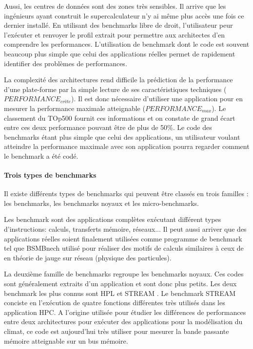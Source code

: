     
    Aussi, les centres de données sont des zones très sensibles. Il arrive que les ingénieurs ayant construit le supercalculateur n'y ai même plus accès une fois ce dernier installé. En utilisant des benchmarks libre de droit, l'utilisateur peur l'exécuter et renvoyer le profil extrait pour permettre aux architectes d'en comprendre les performances. L'utilisation de benchmark dont le code est souvent beaucoup plus simple que celui des applications réelles permet de rapidement identifier des problèmes de performances. 
    
    La complexité des architectures rend difficile la prédiction de la performance d'une plate-forme par la simple lecture de ses caractéristiques techniques ($PERFORMANCE_{crête}$). Il est donc nécessaire d'utiliser une application pour en mesurer la performance maximale atteignable ($PERFORMANCE_{max}$). Le classement du TOp500 fournit ces informations et on constate de grand écart entre ces deux performance pouvant être de plus de 50\%. Le code des benchmarks étant plus simple que celui des applications, un utilisateur voulant atteindre la performance maximale avec son application pourra regarder comment le benchmark a été codé. 


\paragraph{Trois types de benchmarks} Il existe différents types de benchmarks qui peuvent être classés en trois familles \cite{Staelin2004}: les benchmarks, les benchmarks noyaux et les micro-benchmarks.
    
    Les benchmark sont des applications complètes exécutant différent types d'instructions: calculs, transferts mémoire, réseaux... Il peut aussi arriver que des applications réelles soient finalement utilisées comme programme de benchmark tel que BSMBnech \cite{HPC:bsmbench} utilisé pour réaliser des motifs de calculs similaires à ceux de en théorie de jauge sur réseau (physique des particules).
    
    La deuxième famille de benchmarks regroupe les benchmarks noyaux. Ces codes sont généralement extraits d'un application et sont donc plus petits. Les deux benchmark les plus connus sont HPL \cite{HPC:hpl} et STREAM \cite{HPC:stream}. Le benchmark STREAM conciste en l'exécution de quatre fonctions différentes très utilisés dans les application HPC. A l'origine utilisée pour étudier les différences de performances entre deux architectures pour exécuter des applications pour la modélisation du climat, ce code est aujourd'hui très utiliser pour mesurer la bande passante mémoire atteignable sur un bus mémoire. 
   
